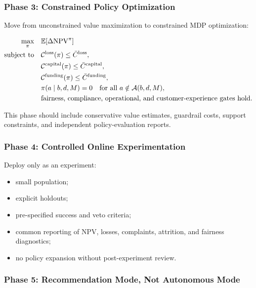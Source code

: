 \documentclass[
]{article}
\newcommand{\E}{\mathbb{E}}
\newcommand{\NPV}{\mathrm{NPV}}
\providecommand{\tightlist}{%
  \setlength{\itemsep}{0pt}\setlength{\parskip}{0pt}}
\begin{document}
\hypertarget{phase-3-constrained-policy-optimization}{%
\subsubsection{Phase 3: Constrained Policy
Optimization}\label{phase-3-constrained-policy-optimization}}

Move from unconstrained value maximization to constrained MDP
optimization:

\begin{align}
  \max_{\pi}\quad
    & \E[\Delta \NPV^{\pi}] \label{eq:phase3-cmdp}\\
  \text{subject to}\quad
    & \mathcal{C}^{\mathrm{loss}}(\pi)\le \bar C^{\mathrm{loss}}, \notag\\
    & \mathcal{C}^{\mathrm{capital}}(\pi)\le \bar C^{\mathrm{capital}}, \notag\\
    & \mathcal{C}^{\mathrm{funding}}(\pi)\le \bar C^{\mathrm{funding}}, \notag\\
    & \pi(a\mid b,d,M)=0
      \quad \text{for all }a\notin\mathcal{A}(b,d,M), \notag\\
    & \text{fairness, compliance, operational, and customer-experience gates hold.} \notag
\end{align}

This phase should include conservative value estimates, guardrail costs,
support constraints, and independent policy-evaluation reports.

\hypertarget{phase-4-controlled-online-experimentation}{%
\subsubsection{Phase 4: Controlled Online
Experimentation}\label{phase-4-controlled-online-experimentation}}

Deploy only as an experiment:

\begin{itemize}
\tightlist
\item
  small population;
\item
  explicit holdouts;
\item
  pre-specified success and veto criteria;
\item
  common reporting of NPV, losses, complaints, attrition, and fairness
  diagnostics;
\item
  no policy expansion without post-experiment review.
\end{itemize}

\hypertarget{phase-5-recommendation-mode-not-autonomous-mode}{%
\subsubsection{Phase 5: Recommendation Mode, Not Autonomous
Mode}\label{phase-5-recommendation-mode-not-autonomous-mode}}
\end{document}
